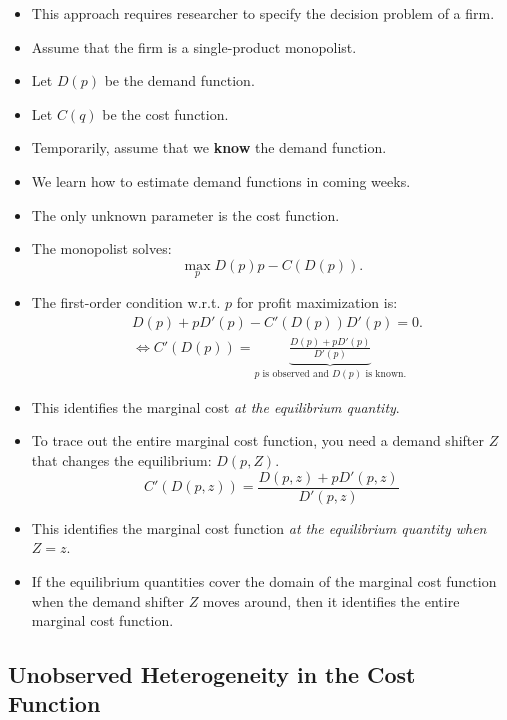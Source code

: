 \documentclass[
]{book}
\begin{document}
\begin{itemize}
\item
  This approach requires researcher to specify the decision problem of a firm.
\item
  Assume that the firm is a single-product monopolist.
\item
  Let \(D(p)\) be the demand function.
\item
  Let \(C(q)\) be the cost function.
\item
  Temporarily, assume that we \textbf{know} the demand function.
\item
  We learn how to estimate demand functions in coming weeks.
\item
  The only unknown parameter is the cost function.
\item
  The monopolist solves:
  \begin{equation}
  \max_{p} D(p)p - C(D(p)).
  \end{equation}
\item
  The first-order condition w.r.t. \(p\) for profit maximization is:
  \begin{equation}
  \begin{split}
  &D(p) + pD'(p) - C'(D(p)) D'(p) = 0.\\
  &\Leftrightarrow C'(D(p)) = \underbrace{\frac{D(p) + pD'(p)}{D'(p)}}_{\text{$p$ is observed and $D(p)$ is known.}}
  \end{split}
  \end{equation}
\item
  This identifies the marginal cost \textit{at the equilibrium quantity}.
\item
  To trace out the entire marginal cost function, you need a demand shifter \(Z\) that changes the equilibrium: \(D(p, Z)\).
  \begin{equation}
  C'(D(p, z)) = \frac{D(p, z) + pD'(p, z)}{D'(p, z)}
  \end{equation}
\item
  This identifies the marginal cost function \textit{at the equilibrium quantity when $Z = z$}.
\item
  If the equilibrium quantities cover the domain of the marginal cost function when the demand shifter \(Z\) moves around, then it identifies the entire marginal cost function.
\end{itemize}

\hypertarget{unobserved-heterogeneity-in-the-cost-function}{%
\subsection{Unobserved Heterogeneity in the Cost Function}\label{unobserved-heterogeneity-in-the-cost-function}}
\end{document}

